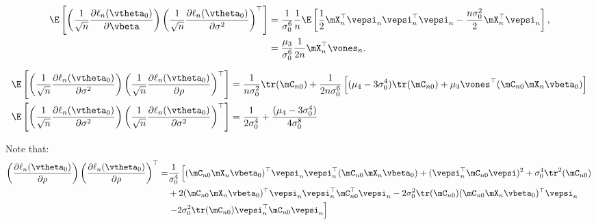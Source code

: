 \documentclass[english,12pt]{book}\usepackage[]{graphicx}\usepackage[]{xcolor}
\begin{document}
\begin{subappendices}
\begin{equation*}
\begin{aligned}
\E\left[\left(\frac{1}{\sqrt{n}}\frac{\partial \ell_n(\vtheta_0)}{\partial \vbeta}\right) \left(\frac{1}{\sqrt{n}}\frac{\partial \ell_n(\vtheta_0)}{\partial \sigma^2}\right)^\top\right] & = \frac{1}{\sigma_0^6}\frac{1}{n}\E\left[\frac{1}{2}\mX_n^\top\vepsi_n\vepsi_n^\top\vepsi_n - \frac{n\sigma_0^2}{2}\mX_n^\top\vepsi_n\right], \\
& = \frac{\mu_3}{\sigma_0^6}\frac{1}{2n}\mX_n^\top\vones_n.
\end{aligned}
\end{equation*}

\begin{equation*}
\begin{aligned}
\E\left[\left(\frac{1}{\sqrt{n}}\frac{\partial \ell_n(\vtheta_0)}{\partial \sigma^2}\right) \left(\frac{1}{\sqrt{n}}\frac{\partial \ell_n(\vtheta_0)}{\partial \rho}\right)^\top\right] & =  \frac{1}{n\sigma_0^2}\tr(\mC_{n0})+ \frac{1}{2n\sigma_0^6}\left[(\mu_4 - 3\sigma_0^4)\tr(\mC_{n0}) + \mu_3\vones^\top(\mC_{n0}\mX_n\vbeta_0)\right] \\
\E\left[\left(\frac{1}{\sqrt{n}}\frac{\partial \ell_n(\vtheta_0)}{\partial \sigma^2}\right) \left(\frac{1}{\sqrt{n}}\frac{\partial \ell_n(\vtheta_0)}{\partial \sigma^2}\right)^\top\right] & = \frac{1}{2\sigma_0^4}+ \frac{(\mu_4 - 3\sigma_0^4)}{4\sigma_0^8}
\end{aligned}
\end{equation*}

Note that:
\begin{align*}
\left(\frac{\partial \ell_n(\vtheta_0)}{\partial \rho}\right)\left(\frac{\partial \ell_n(\vtheta_0)}{\partial \rho}\right)^\top  = &  \frac{1}{\sigma_0^4}\left[(\mC_{n0}\mX_n\vbeta_0)^\top \vepsi_n\vepsi_n^\top(\mC_{n0}\mX_n\vbeta_0) + (\vepsi_n^\top\mC_{n0}\vepsi)^2 + \sigma_{0}^4\tr^2(\mC_{n0})\right. \\
& + 2(\mC_{n0}\mX_n\vbeta_0)^\top \vepsi_n\vepsi_n^\top\mC_{n0}^\top\vepsi_n - 2\sigma_{0}^2\tr(\mC_{n0})(\mC_{n0}\mX_n\vbeta_0)^\top \vepsi_n  \\
& \left.- 2\sigma_{0}^2\tr(\mC_{n0})\vepsi_n^\top\mC_{n0}\vepsi_n\right]
\end{align*}


\end{subappendices}
\end{document}
